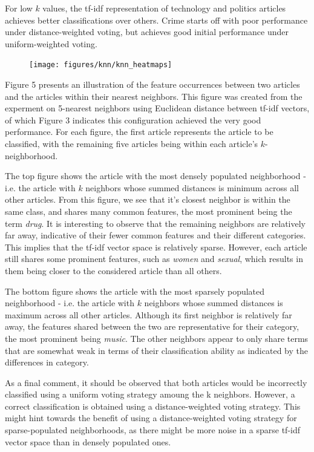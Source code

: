 \documentclass[11pt]{article}
\begin{document}
For low $k$ values, the tf-idf representation of technology and politics articles achieves better classifications over others.
Crime starts off with poor performance under distance-weighted voting, but achieves good initial performance under uniform-weighted voting.


\begin{figure}[h!] \label{fig:heatmap_neighborhoods}
  \centering
  \texttt{[image: figures/knn/knn\_heatmaps]}
  \caption{}
\end{figure}

Figure 5 presents an illustration of the feature occurrences between two articles and the articles within their nearest neighbors.
This figure was created from the experment on 5-nearest neighbors using Euclidean distance between tf-idf vectors, of which Figure 3 indicates this configuration achieved the very good performance.
For each figure, the first article represents the article to be classified, with the remaining five articles being within each article's $k$-neighborhood.

The top figure shows the article with the most densely populated neighborhood - i.e. the article with $k$ neighbors whose summed distances is minimum across all other articles.
From this figure, we see that it's closest neighbor is within the same class, and shares many common features, the most prominent being the term \emph{drug}.
It is interesting to observe that the remaining neighbors are relatively far away, indicative of their fewer common features and their different categories.
This implies that the tf-idf vector space is relatively sparse.
However, each article still shares some prominent features, such as \emph{women} and \emph{sexual}, which results in them being closer to the considered article than all others.

The bottom figure shows the article with the most sparsely populated neighborhood - i.e. the article with $k$ neighbors whose summed distances is maximum across all other articles.
Although its first neighbor is relatively far away, the features shared between the two are representative for their category, the most prominent being \emph{music}.
The other neighbors appear to only share terms that are somewhat weak in terms of their classification ability as indicated by the differences in category.

As a final comment, it should be observed that both articles would be incorrectly classified using a uniform voting strategy amoung the k neighbors.
However, a correct classification is obtained using a distance-weighted voting strategy.
This might hint towards the benefit of using a distance-weighted voting strategy for sparse-populated neighborhoods, as there might be more noise in a sparse tf-idf vector space than in densely populated ones.
\end{document}
